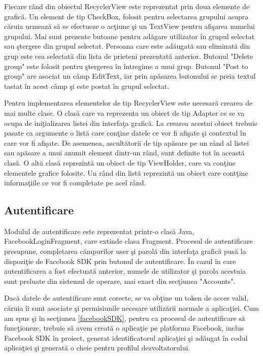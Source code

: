 	Fiecare r\^{a}nd din obiectul RecyclerView este reprezentat prin doua elemente de grafic\u{a}. Un element de tip CheckBox, folosit pentru selectarea grupului asupra c\u{a}ruia urmeaz\u{a} s\u{a} se efectueze o ac\c{t}iune \c{s}i un TextView pentru afi\c{s}area numelui grupului. Mai sunt prezente butoane pentru ad\u{a}gare utilizator \^{i}n grupul selectat sau \c{s}tergere din grupul selectat. Persoana care este ad\u{a}ugat\u{a} sau eliminat\u{a} din grup este cea selectat\u{a} din lista de prieteni prezentat\u{a} anterior. Butonul "Delete group" este folosit pentru \c{s}tergerea \^{i}n \^{i}ntregime a unui grup. Butonul "Post to group" are asociat un c\^{a}mp EditText, iar prin ap\u{a}sarea butonului se preia textul tastat \^{i}n acest c\^{a}mp \c{s}i este postat \^{i}n grupul selectat. 
	
	Pentru implementarea elementelor de tip RecyclerView este necesar\u{a} crearea de mai multe clase. O clas\u{a} care va reprezenta un obiect de tip Adapter ce se va ocupa de ini\c{t}ializarea listei din interfa\c{t}a grafic\u{a}. La crearea acestui obiect trebuie pasate ca argumente o list\u{a} care con\c{t}ine datele ce vor fi afi\c{s}ate \c{s}i contextul \^{i}n care vor fi afi\c{s}ate. De asemenea, ascult\u{a}torii de tip ap\u{a}sare pe un r\^{a}nd al listei sau ap\u{a}sare a unui anumit element dintr-un r\^{a}nd, sunt definite tot \^{i}n aceast\u{a} clas\u{a}. O alt\u{a} clas\u{a} reprezint\u{a} un obiect de tip ViewHolder, care va con\c{t}ine elementele grafice folosite. Un r\^{a}nd din list\u{a} reprezint\u{a} un obiect care cont\c{t}ine informa\c{t}iile ce vor fi completate pe acel r\^{a}nd. 

\subsection{Autentificare}

Modulul de autentificare este reprezentat printr-o clas\u{a} Java, FacebookLoginFragment, care extinde clasa Fragment. Procesul de autentificare presupune, completarea c\u{a}mpurilor user \c{s}i parol\u{a} din interfa\c{t}a grafic\u{a} pus\u{a} la dispozi\c{t}ie de Facebook SDK prin butonul de autentificare. \^{I}n cazul \^{i}n care autentificarea a fost efectuat\u{a} anterior, numele de utilizator \c{s}i parola acestuia sunt preluate din sistemul de operare, mai exact din sec\c{t}iunea "Accounts".

	Dac\u{a} datele de autentificare sunt corecte, se va ob\c{t}ine un token de acces valid, c\u{a}ruia \^{i}i sunt asociate \c{s}i permisiunile necesare utiliz\u{a}rii normale a aplica\c{t}iei. Cum am spus \c{s}i \^{i}n sec\c{t}iunea \ref{facebookSDK}, pentru ca procesul de autentificare s\u{a} func\c{t}ioneze, trebuie s\u{a} avem creat\u{a} o aplica\c{t}ie pe platforma Facebook, inclus Facebook SDK \^{i}n proiect, generat identificatorul aplica\c{t}iei \c{s}i ad\u{a}ugat \^{i}n codul aplica\c{t}iei \c{s}i generat\u{a} o cheie pentru profilul dezvoltatorului.
	
